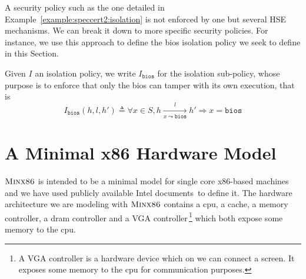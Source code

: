 A security policy such as the one detailed in
Example~\ref{example:speccert2:isolation} is not enforced by one but several HSE
mechanisms.
%
We can break it down to more specific security policies.
%
For instance, we use this approach to define the \ac{bios} isolation policy we seek to define
in this Section. 

\begin{definition}
  \label{def:speccert:biospol}
  Given $I$ an isolation policy, we write $I_{\mathtt{bios}}$ for the isolation
  sub-policy, whose purpose is to enforce that only the \ac{bios} can tamper
  with its own execution, that is
  \[
    I_{\mathtt{bios}}(h, l, h') \triangleq \forall x \in S, h \xrightarrow[x
    \leadsto \mathtt{bios}]{l} h' \Rightarrow x = \mathtt{bios}
  \]
\end{definition}

%

\section{A Minimal x86 Hardware Model}
\label{sec:speccert2:minx86}

$\textsc{Minx86}$ is intended to be a minimal model for single core x86-based
machines and we have used publicly available Intel
documents\,\cite{intel2013celeron,intel2009mch,intel2014manual} to define it.
%
The hardware architecture we are modeling with $\textsc{Minx86}$ contains a
\ac{cpu}, a cache, a memory controller, a \ac{dram} controller and a VGA
controller\,\footnote{A VGA controller is a hardware device which on we can
  connect a screen. It exposes some memory to the \ac{cpu} for communication
  purposes.} which both expose some memory to the \ac{cpu}.

